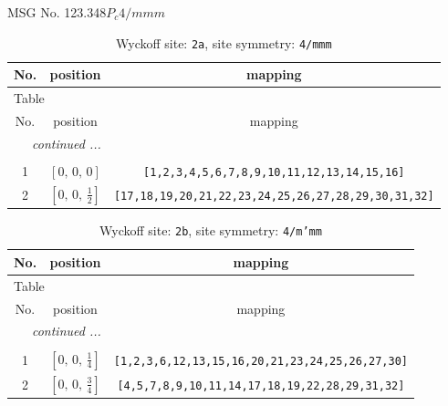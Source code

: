 \documentclass[fleqn,8pt]{jsarticle}
\begin{document}
\setcounter{MaxMatrixCols}{32}

\renewcommand{\tablename}{Table~}
\renewcommand{\figurename}{Figure~}
\begin{center}
\LARGE
MSG No. 123.348\quad$P_{c}4/mmm$
\end{center}
\renewcommand{\arraystretch}{1.2}
\begin{longtable}{ccc}
\caption{Wyckoff site: {\tt 2a}, site symmetry: {\tt 4/mmm}}
 \\
 \hline \hline
No. & position & mapping \\ \hline \endfirsthead

\multicolumn{2}{l}{\tablename\ \thetable{}} \\
 \hline \hline
No. & position & mapping \\ \hline \endhead

 \hline \hline
\multicolumn{2}{r}{\footnotesize\it continued ...} \\ \endfoot

 \hline \hline
\multicolumn{2}{r}{} \\ \endlastfoot

1 & $\left[ 0,\, 0,\, 0 \right]$ & {\tt [1,2,3,4,5,6,7,8,9,10,11,12,13,14,15,16]} \\ \hline
2 & $\left[ 0,\, 0,\, \frac{1}{2} \right]$ & {\tt [17,18,19,20,21,22,23,24,25,26,27,28,29,30,31,32]} \\
\end{longtable}
\renewcommand{\arraystretch}{1.2}
\begin{longtable}{ccc}
\caption{Wyckoff site: {\tt 2b}, site symmetry: {\tt 4/m'mm}}
 \\
 \hline \hline
No. & position & mapping \\ \hline \endfirsthead

\multicolumn{2}{l}{\tablename\ \thetable{}} \\
 \hline \hline
No. & position & mapping \\ \hline \endhead

 \hline \hline
\multicolumn{2}{r}{\footnotesize\it continued ...} \\ \endfoot

 \hline \hline
\multicolumn{2}{r}{} \\ \endlastfoot

1 & $\left[ 0,\, 0,\, \frac{1}{4} \right]$ & {\tt [1,2,3,6,12,13,15,16,20,21,23,24,25,26,27,30]} \\ \hline
2 & $\left[ 0,\, 0,\, \frac{3}{4} \right]$ & {\tt [4,5,7,8,9,10,11,14,17,18,19,22,28,29,31,32]} \\
\end{longtable}
\end{document}
